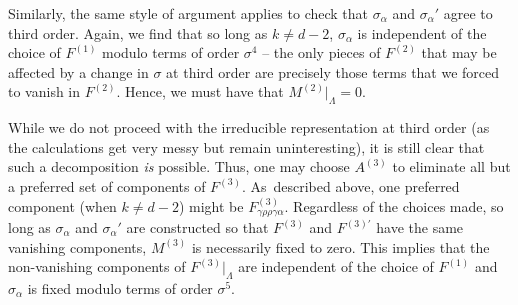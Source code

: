 \documentclass[10pt,a4paper]{article}
\numberwithin{equation}{section}
\renewcommand{\=}{\stackrel \Lambda =}
\begin{document}
Similarly, the same style of argument applies to check that $\sigma_{\alpha}$ and $\sigma_{\alpha}'$ agree to third order. Again, we find that so long as $k \neq d-2$, $\sigma_{\alpha}$ is independent of the choice of $F^{(1)}$ modulo terms of order $\sigma^4$ -- the only pieces of $F^{(2)}$ that may be affected by a change in $\sigma$ at third order are precisely those terms that we forced to vanish in $F^{(2)}$. Hence, we must have that $M^{(2)}|_{\Lambda} = 0$.

While we do not proceed with the irreducible representation at third order (as the calculations get very messy but remain uninteresting), it is still clear that such a decomposition \textit{is} possible. Thus, one may choose $A^{(3)}$ to eliminate all but a preferred set of components of $F^{(3)}$. As~described above, one preferred component (when $k \neq d-2$) might be $F^{(3)}_{\gamma \rho \rho \gamma \alpha}$. Regardless of the choices made, so long as $\sigma_{\alpha}$ and $\sigma_{\alpha}'$ are constructed so that $F^{(3)}$ and $F^{(3)'}$ have the same vanishing components, $M^{(3)}$ is necessarily fixed to zero. This implies that the non-vanishing components of $F^{(3)}|_{\Lambda}$ are independent of the choice of $F^{(1)}$ and $\sigma_{\alpha}$ is fixed modulo terms of order $\sigma^5$.
\end{document}
